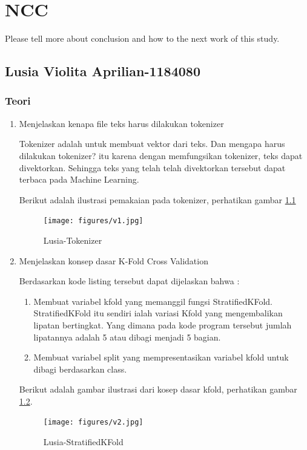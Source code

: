 \chapter{NCC}
Please tell more about conclusion and how to the next work of this study.

\section{Lusia Violita Aprilian-1184080}
\subsection{Teori}
\begin{enumerate}
\item Menjelaskan kenapa file teks harus dilakukan tokenizer
	\par Tokenizer adalah untuk membuat vektor dari teks. Dan mengapa harus dilakukan tokenizer? itu karena dengan memfungsikan tokenizer, teks dapat divektorkan. Sehingga teks yang telah telah divektorkan tersebut dapat terbaca pada Machine Learning.
	\par Berikut adalah ilustrasi pemakaian pada tokenizer, perhatikan gambar \ref{7A1}
		\begin{figure}[!hbtp]
		\centering
		\texttt{[image: figures/v1.jpg]}
		\caption{Lusia-Tokenizer}
		\label{7A1}
		\end{figure}

\item Menjelaskan konsep dasar K-Fold Cross Validation
	
	\par Berdasarkan kode listing tersebut dapat dijelaskan bahwa :
	\begin{enumerate}
	\item Membuat variabel kfold yang memanggil fungsi StratifiedKFold. StratifiedKFold itu sendiri ialah variasi Kfold yang mengembalikan lipatan bertingkat. Yang dimana pada kode program tersebut jumlah lipatannya adalah 5 atau dibagi menjadi 5 bagian.
	\item Membuat variabel split yang mempresentasikan variabel kfold untuk dibagi berdasarkan class.
	\end{enumerate}
	
	\par Berikut adalah gambar ilustrasi dari kosep dasar kfold, perhatikan gambar \ref{7A2}.
		\begin{figure}[!hbtp]
		\centering
		\texttt{[image: figures/v2.jpg]}
		\caption{Lusia-StratifiedKFold}
		\label{7A2}
		\end{figure}


\end{enumerate}
